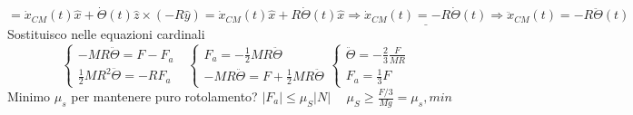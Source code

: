 $$ = \dot{x}_{CM}(t)\hat{x} + \dot{\Theta}(t)\hat{z} \times (-R\hat{y}) = \dot{x}_{CM}(t)\hat{x} + R \dot{\Theta}(t)\hat{x} \Rightarrow \underline{\dot{x}_{CM}(t) = -R\dot{\Theta}(t)} \Rightarrow \ddot{x}_{CM}(t) = -R\ddot{\Theta}(t)$$
Sostituisco nelle equazioni cardinali
$$
\begin{cases}
    -MR\ddot{\Theta} = F - F_a\\
    \frac{1}{2}MR^2 \ddot{\Theta} = -RF_a
\end{cases}
\:\:\:
\begin{cases}
    F_a = -\frac{1}{2}MR\ddot{\Theta}\\
    -MR\ddot{\Theta} = F + \frac{1}{2}MR\ddot{\Theta}
\end{cases}
\begin{cases}
    \ddot{\Theta} = -\frac{2}{3}\frac{F}{MR}\\
    F_a = \frac{1}{3}F
\end{cases}
$$
Minimo $\mu_s$ per mantenere puro rotolamento?
$|F_a| \leq \mu_S|N| \hspace{15pt} \mu_S \geq \frac{F/3}{Mg} = \mu_s,min$

